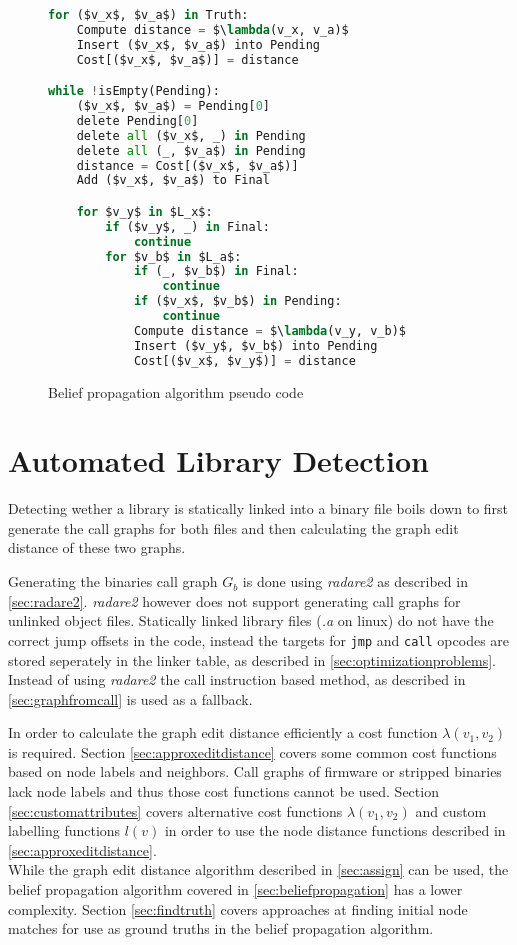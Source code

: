 \documentclass[
    12pt,                               %
    DIV=14,                     %
    parskip=half+,              %
    bigheadings,                %
    cleardoubleempty,   %
    halfparskip,                %
    ]{scrreprt} %
\begin{document}
\begin{figure}[H]
\begin{lstlisting}[language=Python,mathescape=true,tabsize=4]
for ($v_x$, $v_a$) in Truth:
	Compute distance = $\lambda(v_x, v_a)$
	Insert ($v_x$, $v_a$) into Pending
	Cost[($v_x$, $v_a$)] = distance

while !isEmpty(Pending):
	($v_x$, $v_a$) = Pending[0]
	delete Pending[0]
	delete all ($v_x$, _) in Pending
	delete all (_, $v_a$) in Pending
	distance = Cost[($v_x$, $v_a$)]
	Add ($v_x$, $v_a$) to Final

	for $v_y$ in $L_x$:
		if ($v_y$, _) in Final:
			continue
		for $v_b$ in $L_a$:
			if (_, $v_b$) in Final:
				continue
			if ($v_x$, $v_b$) in Pending:
				continue
			Compute distance = $\lambda(v_y, v_b)$
			Insert ($v_y$, $v_b$) into Pending
			Cost[($v_x$, $v_y$)] = distance

\end{lstlisting}
	\caption{Belief propagation algorithm pseudo code}
	\label{fig:graphmatching:propagation:code}
\end{figure}




\chapter{Automated Library Detection} \label{chap:libraryidentification}
Detecting wether a library is statically linked into a binary file boils down to first generate the call graphs for both files and then calculating the graph edit distance of these two graphs.

Generating the binaries call graph $G_b$ is done using \textit{radare2} as described in \ref{sec:radare2}. \textit{radare2} however does not support generating call graphs for unlinked object files. Statically linked library files (\textit{.a} on linux) do not have the correct jump offsets in the code, instead the targets for \verb'jmp' and \verb'call' opcodes are stored seperately in the linker table, as described in \ref{sec:optimizationproblems}. Instead of using \textit{radare2} the call instruction based method, as described in \ref{sec:graphfromcall} is used as a fallback.

In order to calculate the graph edit distance efficiently a cost function $\lambda(v_1, v_2)$ is required. Section \ref{sec:approxeditdistance} covers some common cost functions based on node labels and neighbors. Call graphs of firmware or stripped binaries lack node labels and thus those cost functions cannot be used. Section \ref{sec:customattributes} covers alternative cost functions $\lambda(v_1, v_2)$ and custom labelling functions $l(v)$ in order to use the node distance functions described in \ref{sec:approxeditdistance}. \\
While the graph edit distance algorithm described in \ref{sec:assign} can be used, the belief propagation algorithm covered in \ref{sec:beliefpropagation} has a lower complexity. Section \ref{sec:findtruth} covers approaches at finding initial node matches for use as ground truths in the belief propagation algorithm.
\end{document}
